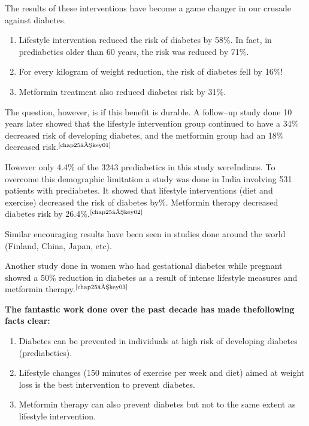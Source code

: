 The results of these interventions have become a game changer in our crusade against diabetes.

\vspace{-\topsep}
\begin{enumerate}[•]
\itemsep=0pt
\item Lifestyle intervention reduced the risk of diabetes by 58\%. In fact, in prediabetics older than 60 years, the risk was reduced by 71\%.
\item For every kilogram of weight reduction, the risk of diabetes fell by 16\%!
\item Metformin treatment also reduced diabetes risk by 31\%.
\end{enumerate}
\vspace{-\topsep}

The question, however, is if this benefit is durable. A follow–up study done 10 years later showed that the lifestyle intervention group continued to have a 34\% decreased risk of developing diabetes, and the metformin group had an 18\% decreased risk.$^{\text{\cite{chap25–key01}}}$

However only 4.4\% of the 3243 prediabetics in this study were\break Indians. To overcome this demographic limitation a study was done in India involving 531 patients with prediabetes. It showed that lifestyle interventions (diet and exercise) decreased the risk of diabetes by\%. Metformin therapy decreased diabetes risk by 26.4\%.$^{\text{\cite{chap25–key02}}}$

Similar encouraging results have been seen in studies done around the world (Finland, China, Japan, etc).

Another study done in women who had gestational diabetes while pregnant showed a 50\% reduction in diabetes as a result of intense lifestyle measures and metformin therapy.$^{\text{\cite{chap25–key03}}}$

\vskip 6pt

\noindent\textbf{The fantastic work done over the past decade has made the\break following facts clear:}

\begin{enumerate}[•]
\itemsep=0pt
\item Diabetes can be prevented in individuals at high risk of developing diabetes (prediabetics).
\item Lifestyle changes (150 minutes of exercise per week and diet) aimed at weight loss is the best intervention to prevent diabetes.
\item Metformin therapy can also prevent diabetes but not to the same extent as lifestyle intervention.
\end{enumerate}

